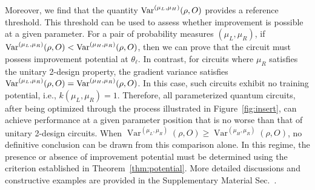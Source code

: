 \documentclass[%
 superscriptaddress,
 aps,prl,
 reprint,
 twocolumn,
 amsmath,amssymb,showpacs,
 bibnotes,
]{revtex4-2}
\newcommand{\RomanNumeralCaps}[1]
    {\MakeUppercase{\romannumeral #1}}
\begin{document}
Moreover, we find that the quantity ${\rm Var}^{(\mu_L, \mu_H)}(\rho, O)$ provides a reference threshold. This threshold can be used to assess whether improvement is possible at a given parameter. For a pair of probability measures $(\mu_L, \mu_R)$, if ${\rm Var}^{(\mu_L, \mu_R)}(\rho, O) < {\rm Var}^{(\mu_H, \mu_R)}(\rho, O)$, then we can prove that the circuit must possess improvement potential at $\theta_\ell$. In contrast, for circuits where $\mu_R$ satisfies the unitary 2-design property, the gradient variance satisfies ${\rm Var}^{(\mu_L, \mu_R)}(\rho, O) = {\rm Var}^{(\mu_H, \mu_R)}(\rho, O)$. In this case, such circuits exhibit no training potential, i.e., $k(\mu_L, \mu_R) = 1$. Therefore, all parameterized quantum circuits, after being optimized through the process illustrated in Figure~\ref{fig:insert}, can achieve performance at a given parameter position that is no worse than that of unitary 2-design circuits. When $\operatorname{Var}^{(\mu_L, \mu_R)}(\rho, O) \geq \operatorname{Var}^{(\mu_H, \mu_R)}(\rho, O)$, no definitive conclusion can be drawn from this comparison alone. In this regime, the presence or absence of improvement potential must be determined using the criterion established in Theorem~\ref{thm:potential}. More detailed discussions and constructive examples are provided in the Supplementary Material Sec.~\RomanNumeralCaps{5}.

\end{document}
